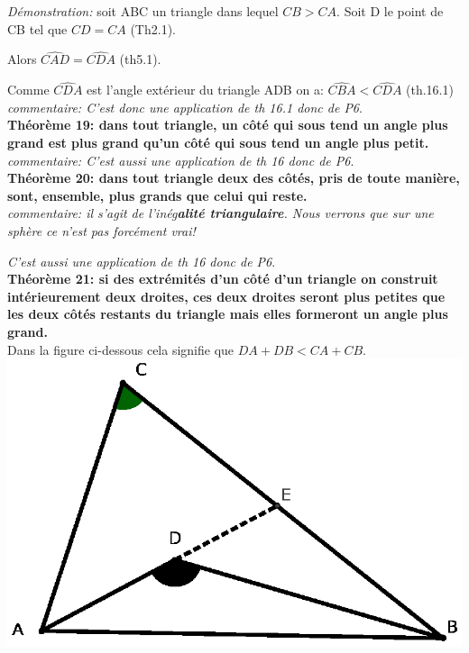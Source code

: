 \documentclass[a4paper, 12pt, twoside]{book}
\begin{document}
\textit{Démonstration:} soit ABC un triangle dans lequel $CB>CA$. Soit D le point de CB tel que $CD=CA$ (Th2.1).\

 Alors $\hat{CAD}=\hat{CDA}$ (th5.1).\
 
  Comme $\hat{CDA}$ est l'angle extérieur du triangle ADB on a: $\hat{CBA}<\hat{CDA}$ (th.16.1) \\

\textit{commentaire: C'est donc une application de th 16.1 donc de P6}.\\

 \textbf{Théorème 19:  dans tout triangle, un  côté  qui sous tend un angle plus grand est plus grand qu'un côté qui sous tend un angle plus petit.}\\
 
 \textit{commentaire: C'est aussi une application de th 16 donc de P6}.\\
 
 \textbf{Théorème 20: dans tout triangle deux des côtés, pris de toute manière, sont, ensemble, plus grands que celui qui reste.}\\
 

 
 \textit{commentaire: il s'agit de l'inég\textbf{alité triangulaire}. Nous verrons que sur une sphère ce n'est pas forcément vrai!}
 
 \textit{C'est aussi une application de th 16 donc de P6}.\\
 
\newpage  \textbf{Théorème 21: si des extrémités d'un côté d'un triangle on construit intérieurement deux droites, ces deux droites seront plus petites que les deux côtés restants du triangle mais elles formeront un angle plus grand.}\\

Dans la figure ci-dessous cela signifie que $DA+DB<CA+CB$.\\

  
 \includegraphics[scale=0.5]{figures/th21.eps}\\\
  
\end{document}
